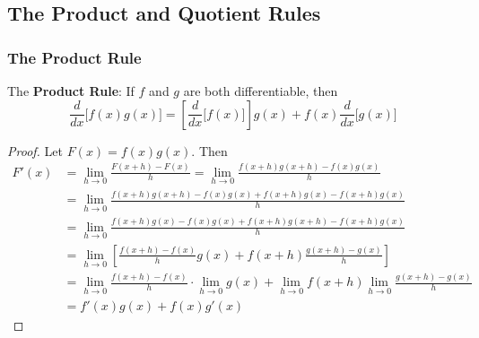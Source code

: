 \subsection{The Product and Quotient Rules}

\subsubsection*{The Product Rule}
The \textbf{Product Rule}: If \(f\) and \(g\) are both differentiable, then
\[\frac{d}{dx}\big[f(x)g(x)\big]
=\left[\frac{d}{dx}\big[f(x)\big]\right]g(x)+f(x)\frac{d}{dx}\big[g(x)\big]\]
\begin{proof}
    Let \(F(x)=f(x)g(x)\).
    Then
    \begin{align*}
        F'(x) 
        &= \lim_{h\to 0}\frac{F(x+h)-F(x)}{h}
        =\lim_{h\to 0}\frac{f(x+h)g(x+h)-f(x)g(x)}{h} \\
        &= \lim_{h\to 0}\frac{f(x+h)g(x+h)-f(x)g(x)+f(x+h)g(x)-f(x+h)g(x)}{h} \\
        &= \lim_{h\to 0}\frac{f(x+h)g(x)-f(x)g(x)+f(x+h)g(x+h)-f(x+h)g(x)}{h} \\
        &= \lim_{h\to 0}
        \left[\frac{f(x+h)-f(x)}{h}g(x)+f(x+h)\frac{g(x+h)-g(x)}{h}\right] \\
        &= \lim_{h\to 0}\frac{f(x+h)-f(x)}{h}\cdot\lim_{h\to 0}g(x)
        +\lim_{h\to 0}f(x+h)\lim_{h\to 0}\frac{g(x+h)-g(x)}{h} \\
        &= f'(x)g(x)+f(x)g'(x)
    \end{align*}
\end{proof}

